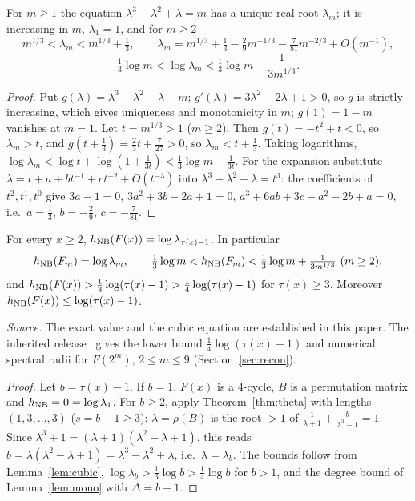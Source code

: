 \begin{lemma}\label{lem:cubic}
For $m\ge1$ the equation $\lambda^3-\lambda^2+\lambda=m$ has a unique real root $\lambda_m$; it is increasing in $m$, $\lambda_1=1$, and for $m\ge2$
\[
m^{1/3}<\lambda_m<m^{1/3}+\tfrac13,\qquad
\lambda_m=m^{1/3}+\tfrac13-\tfrac29m^{-1/3}-\tfrac7{81}m^{-2/3}+O(m^{-1}),
\]
\[
\tfrac13\log m<\log\lambda_m<\tfrac13\log m+\frac1{3m^{1/3}} .
\]
\end{lemma}
\begin{proof}
Put $g(\lambda)=\lambda^3-\lambda^2+\lambda-m$; $g'(\lambda)=3\lambda^2-2\lambda+1>0$, so $g$ is strictly increasing, which gives uniqueness and monotonicity in $m$; $g(1)=1-m$ vanishes at $m=1$. Let $t=m^{1/3}>1$ ($m\ge2$). Then $g(t)=-t^2+t<0$, so $\lambda_m>t$, and $g(t+\tfrac13)=\tfrac23t+\tfrac7{27}>0$, so $\lambda_m<t+\tfrac13$. Taking logarithms, $\log\lambda_m<\log t+\log(1+\tfrac1{3t})<\tfrac13\log m+\tfrac1{3t}$. For the expansion substitute $\lambda=t+a+bt^{-1}+ct^{-2}+O(t^{-3})$ into $\lambda^3-\lambda^2+\lambda=t^3$: the coefficients of $t^2,t^1,t^0$ give $3a-1=0$, $3a^2+3b-2a+1=0$, $a^3+6ab+3c-a^2-2b+a=0$, i.e.\ $a=\tfrac13$, $b=-\tfrac29$, $c=-\tfrac7{81}$. \qedhere
\end{proof}

\begin{theorem}\label{thm:entropy}
For every $x\ge2$, $h_{\mathrm{NB}}(F(x))=\log\lambda_{\tau(x)-1}$. In particular
\[
h_{\mathrm{NB}}(F_m)=\log\lambda_m,\qquad \tfrac13\log m<h_{\mathrm{NB}}(F_m)<\tfrac13\log m+\tfrac{1}{3m^{1/3}}\ (m\ge2),
\]
and $h_{\mathrm{NB}}(F(x))>\tfrac13\log(\tau(x)-1)>\tfrac14\log(\tau(x)-1)$ for $\tau(x)\ge3$. Moreover $h_{\mathrm{NB}}(F(x))\le\log(\tau(x)-1)$.
\end{theorem}
\noindent\emph{Source.} The exact value and the cubic equation are established in this paper. The inherited release~\cite{UENT} gives the lower bound $\tfrac14\log(\tau(x)-1)$ and numerical spectral radii for $F(2^m)$, $2\le m\le9$ (Section~\ref{sec:recon}).
\begin{proof}
Let $b=\tau(x)-1$. If $b=1$, $F(x)$ is a $4$-cycle, $B$ is a permutation matrix and $h_{\mathrm{NB}}=0=\log\lambda_1$. For $b\ge2$, apply Theorem~\ref{thm:theta} with lengths $(1,3,\dots,3)$ ($s=b+1\ge3$): $\lambda=\rho(B)$ is the root $>1$ of $\frac1{\lambda+1}+\frac b{\lambda^3+1}=1$. Since $\lambda^3+1=(\lambda+1)(\lambda^2-\lambda+1)$, this reads $b=\lambda(\lambda^2-\lambda+1)=\lambda^3-\lambda^2+\lambda$, i.e.\ $\lambda=\lambda_b$. The bounds follow from Lemma~\ref{lem:cubic}, $\log\lambda_b>\tfrac13\log b>\tfrac14\log b$ for $b>1$, and the degree bound of Lemma~\ref{lem:mono} with $\Delta=b+1$. \qedhere
\end{proof}

